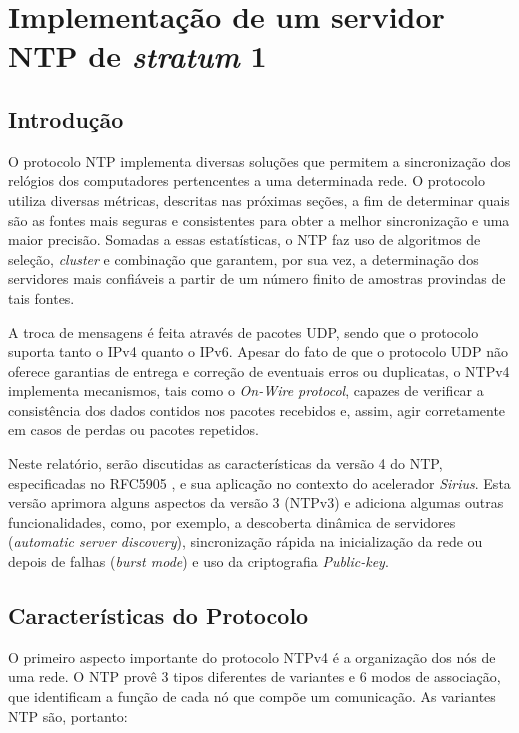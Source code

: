 \section {Implementação de um servidor NTP de \textit{stratum} 1}

\subsection {Introdução}

O protocolo NTP implementa diversas soluções que permitem a sincronização dos
relógios dos computadores pertencentes a uma determinada rede. O protocolo
utiliza diversas métricas, descritas nas próximas seções, a fim de determinar
quais são as fontes mais seguras e consistentes para obter a melhor
sincronização e uma maior precisão. Somadas a essas estatísticas, o NTP faz uso
de algoritmos de seleção, \textit{cluster} e combinação que garantem, por sua
vez, a determinação dos servidores mais confiáveis a partir de um número finito
de amostras provindas de tais fontes. 

\vspace{12pt}

A troca de mensagens é feita através de pacotes UDP, sendo que o protocolo
suporta tanto o IPv4 quanto o IPv6. Apesar do fato de que o protocolo UDP não
oferece garantias de entrega e correção de eventuais erros ou duplicatas, o
NTPv4 implementa mecanismos, tais como o \textit{On-Wire protocol}, capazes de
verificar a consistência dos dados contidos nos pacotes recebidos e, assim,
agir corretamente em casos de perdas ou pacotes repetidos. 

\vspace{12pt}

Neste relatório, serão discutidas as características da versão 4 do NTP,
especificadas no RFC5905 \cite{ntpv4rtp}, e sua aplicação no contexto do
acelerador \textit{Sirius}. Esta versão aprimora alguns aspectos da versão 3
(NTPv3) e adiciona algumas outras funcionalidades, como, por exemplo, a
descoberta dinâmica de servidores (\textit{automatic server discovery}),
sincronização rápida na inicialização da rede ou depois de falhas (\textit{burst
mode}) e uso da criptografia \textit{Public-key}.

\subsection {Características do Protocolo}

O primeiro aspecto importante do protocolo NTPv4 é a organização dos
nós de uma rede. O NTP provê 3 tipos diferentes de variantes 
e 6 modos de associação, que identificam a função de cada nó que
compõe um comunicação. As variantes NTP são, portanto:

